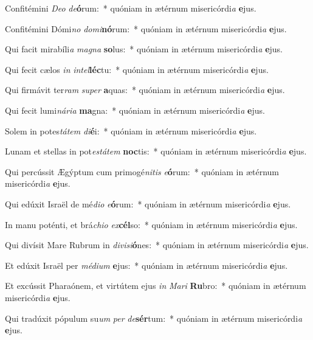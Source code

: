 \item Confitémini \textit{De}\textit{o} \textit{de}\textbf{ó}rum:~* quóniam in ætérnum misericórdi\textit{a} \textbf{e}jus.
\item Confitémini Dómi\textit{no} \textit{do}\textit{mi}\textbf{nó}rum:~* quóniam in ætérnum misericórdi\textit{a} \textbf{e}jus.
\item Qui facit mirabíli\textit{a} \textit{ma}\textit{gna} \textbf{so}lus:~* quóniam in ætérnum misericórdi\textit{a} \textbf{e}jus.
\item Qui fecit cælos \textit{in} \textit{in}\textit{tel}\textbf{léc}tu:~* quóniam in ætérnum misericórdi\textit{a} \textbf{e}jus.
\item Qui firmávit ter\textit{ram} \textit{su}\textit{per} \textbf{a}quas:~* quóniam in ætérnum misericórdi\textit{a} \textbf{e}jus.
\item Qui fecit lumi\textit{ná}\textit{ri}\textit{a} \textbf{ma}gna:~* quóniam in ætérnum misericórdi\textit{a} \textbf{e}jus.
\item Solem in potes\textit{tá}\textit{tem} \textit{di}\textbf{é}i:~* quóniam in ætérnum misericórdi\textit{a} \textbf{e}jus.
\item Lunam et stellas in pot\textit{es}\textit{tá}\textit{tem} \textbf{noc}tis:~* quóniam in ætérnum misericórdi\textit{a} \textbf{e}jus.
\item Qui percússit Ægýptum cum primogé\textit{ni}\textit{tis} \textit{e}\textbf{ó}rum:~* quóniam in ætérnum misericórdi\textit{a} \textbf{e}jus.
\item Qui edúxit Israël de mé\textit{di}\textit{o} \textit{e}\textbf{ó}rum:~* quóniam in ætérnum misericórdi\textit{a} \textbf{e}jus.
\item In manu poténti, et brá\textit{chi}\textit{o} \textit{ex}\textbf{cél}so:~* quóniam in ætérnum misericórdi\textit{a} \textbf{e}jus.
\item Qui divísit Mare Rubrum in \textit{di}\textit{vi}\textit{si}\textbf{ó}nes:~* quóniam in ætérnum misericórdi\textit{a} \textbf{e}jus.
\item Et edúxit Israël per \textit{mé}\textit{di}\textit{um} \textbf{e}jus:~* quóniam in ætérnum misericórdi\textit{a} \textbf{e}jus.
\item Et excússit Pharaónem, et virtútem ejus \textit{in} \textit{Ma}\textit{ri} \textbf{Ru}bro:~* quóniam in ætérnum misericórdi\textit{a} \textbf{e}jus.
\item Qui tradúxit pópulum su\textit{um} \textit{per} \textit{de}\textbf{sér}tum:~* quóniam in ætérnum misericórdi\textit{a} \textbf{e}jus.
